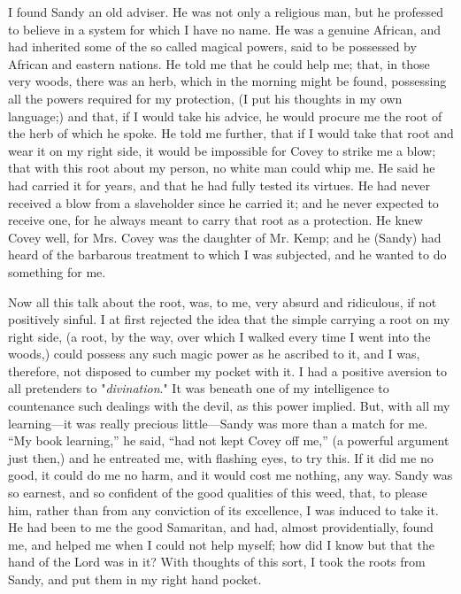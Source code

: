 I found Sandy an old adviser. He was not only a religious man, but he
professed to believe in a system for which I have no name. He was a
genuine African, and had inherited some of the so called magical powers,
said to be possessed by African and eastern nations. He told me that he
could help me; that, in those very woods, there was an herb, which in
the morning might be found, possessing all the powers required for my
protection, (I put his thoughts in my own language;) and that, if I
would take his advice, he would procure me the root of the herb of which
he spoke. He told me further, that if I would take that root and wear it
on my right side, it would be impossible for Covey to strike me a blow;
that with this root about my person, no white man could whip me. He said
he had carried it for years, and that he had fully tested its virtues.
He had never received a blow from a slaveholder since he carried it; and
he never expected to receive one, for he always meant to carry that root
as a protection. He knew Covey well, for Mrs. Covey was the daughter of
Mr. Kemp; and he (Sandy) had heard of the barbarous treatment
{\protect\hypertarget{239}{}{}}to which I was subjected, and he wanted
to do something for me.

Now all this talk about the root, was, to me, very absurd and
ridiculous, if not positively sinful. I at first rejected the idea that
the simple carrying a root on my right side, (a root, by the way, over
which I walked every time I went into the woods,) could possess any such
magic power as he ascribed to it, and I was, therefore, not disposed to
cumber my pocket with it. I had a positive aversion to all pretenders to
"\emph{divination}." It was beneath one of my intelligence to
countenance such dealings with the devil, as this power implied. But,
with all my learning---it was really precious little---Sandy was more
than a match for me. ``My book learning,'' he said, ``had not kept Covey
off me,'' (a powerful argument just then,) and he entreated me, with
flashing eyes, to try this. If it did me no good, it could do me no
harm, and it would cost me nothing, any way. Sandy was so earnest, and
so confident of the good qualities of this weed, that, to please him,
rather than from any conviction of its excellence, I was induced to take
it. He had been to me the good Samaritan, and had, almost
providentially, found me, and helped me when I could not help myself;
how did I know but that the hand of the Lord was in it? With thoughts of
this sort, I took the roots from Sandy, and put them in my right hand
pocket.


